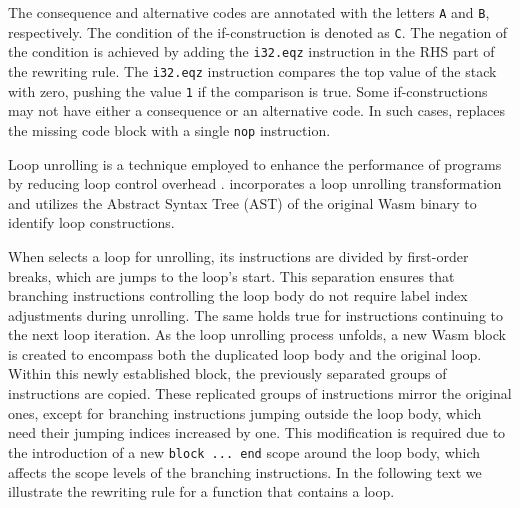 
The consequence and alternative codes are annotated with the letters \texttt{A} and \texttt{B}, respectively.
The condition of the if-construction is denoted as \texttt{C}.
The negation of the condition is achieved by adding the \texttt{i32.eqz} instruction in the RHS part of the rewriting rule.
The \texttt{i32.eqz} instruction compares the top value of the stack with zero, pushing the value \texttt{1} if the comparison is true.
Some if-constructions may not have either a consequence or an alternative code.
In such cases, \tool replaces the missing code block with a single \texttt{nop} instruction.




Loop unrolling is a technique employed to enhance the performance of programs by reducing loop control overhead \cite{dongarra1979unrolling}. 
\tool incorporates a loop unrolling transformation and utilizes the Abstract Syntax Tree (AST) of the original Wasm binary to identify loop constructions. 

When \tool selects a loop for unrolling, its instructions are divided by first-order breaks, which are jumps to the loop's start. 
This separation ensures that branching instructions controlling the loop body do not require label index adjustments during unrolling. 
The same holds true for instructions continuing to the next loop iteration.
As the loop unrolling process unfolds, a new Wasm block is created to encompass both the duplicated loop body and the original loop. 
Within this newly established block, the previously separated groups of instructions are copied. 
These replicated groups of instructions mirror the original ones, except for branching instructions jumping outside the loop body, which need their jumping indices increased by one. 
This modification is required due to the introduction of a new \texttt{block ... end} scope around the loop body, which affects the scope levels of the branching instructions.
In the following text we illustrate the rewriting rule for a function that contains a loop. 



